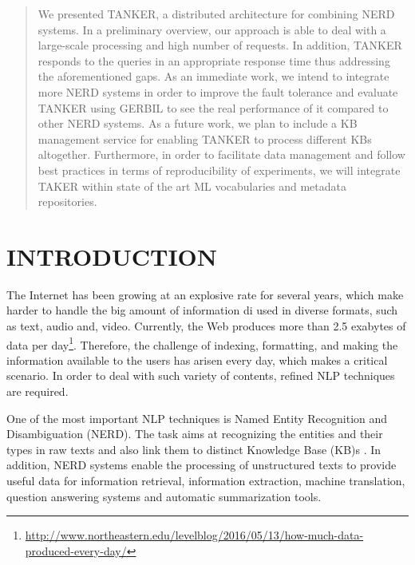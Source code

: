 \documentclass{sig-alternate}
\begin{document}

\begin{abstract}
We presented TANKER, a distributed architecture for combining NERD systems. In a preliminary overview, our approach is able to deal with a large-scale processing and high number of requests. In addition, TANKER responds to the queries in an appropriate response time thus addressing the aforementioned gaps. As an immediate work, we intend to integrate more NERD systems in order to improve the fault tolerance and evaluate TANKER using GERBIL \cite{_Ref490775154} to see the real performance of it compared to other NERD systems. As a future work, we plan to include a KB management service for enabling TANKER to process different KBs altogether. Furthermore, in order to facilitate data management and follow best practices in terms of reproducibility of experiments, we will integrate TAKER within state of the art ML vocabularies and metadata repositories.
\end{abstract}



\section{INTRODUCTION}

The Internet has been growing at an explosive rate for several years, which make harder to handle the big amount of information di used in diverse formats, such as text, audio and, video. Currently, the Web produces more than 2.5 exabytes of data per day\footnote{\url{http://www.northeastern.edu/levelblog/2016/05/13/how-much-data-produced-every-day/}}. Therefore, the challenge of indexing, formatting, and making the information available to the users has arisen every day, which makes a critical scenario. In order to deal with such variety of contents, refined NLP techniques are required.

One of the most important NLP techniques is Named Entity Recognition and Disambiguation (NERD). The task aims at recognizing the entities and their types in raw texts and also link them to distinct Knowledge Base (KB)s \cite{_Ref490759706}. In addition, NERD systems enable the processing of unstructured texts to provide useful data for information retrieval, information extraction, machine translation, question answering systems and automatic summarization tools.
\end{document}
